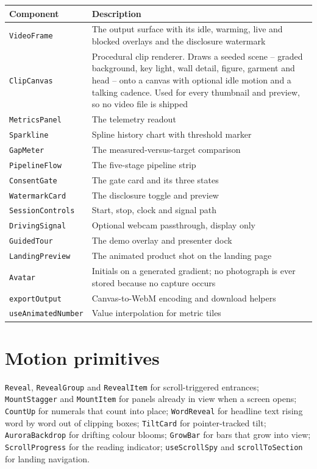 \documentclass[11pt,a4paper]{report}
\newcommand{\code}[1]{\texttt{\small #1}}
\begin{document}
\begin{longtable}{L{3.2cm} L{11.6cm}}
\toprule
\textbf{Component} & \textbf{Description} \\
\midrule
\endhead
\code{VideoFrame} & The output surface with its idle, warming, live and blocked
  overlays and the disclosure watermark \\
\code{ClipCanvas} & Procedural clip renderer. Draws a seeded scene -- graded
  background, key light, wall detail, figure, garment and head -- onto a canvas
  with optional idle motion and a talking cadence. Used for every thumbnail and
  preview, so no video file is shipped \\
\code{MetricsPanel} & The telemetry readout \\
\code{Sparkline} & Spline history chart with threshold marker \\
\code{GapMeter} & The measured-versus-target comparison \\
\code{PipelineFlow} & The five-stage pipeline strip \\
\code{ConsentGate} & The gate card and its three states \\
\code{WatermarkCard} & The disclosure toggle and preview \\
\code{SessionControls} & Start, stop, clock and signal path \\
\code{DrivingSignal} & Optional webcam passthrough, display only \\
\code{GuidedTour} & The demo overlay and presenter dock \\
\code{LandingPreview} & The animated product shot on the landing page \\
\code{Avatar} & Initials on a generated gradient; no photograph is ever stored
  because no capture occurs \\
\code{exportOutput} & Canvas-to-WebM encoding and download helpers \\
\code{useAnimatedNumber} & Value interpolation for metric tiles \\
\bottomrule
\end{longtable}

\section{Motion primitives}

\code{Reveal}, \code{RevealGroup} and \code{RevealItem} for scroll-triggered
entrances; \code{MountStagger} and \code{MountItem} for panels already in view
when a screen opens; \code{CountUp} for numerals that count into place;
\code{WordReveal} for headline text rising word by word out of clipping boxes;
\code{TiltCard} for pointer-tracked tilt; \code{AuroraBackdrop} for drifting
colour blooms; \code{GrowBar} for bars that grow into view;
\code{ScrollProgress} for the reading indicator; \code{useScrollSpy} and
\code{scrollToSection} for landing navigation.
\end{document}
